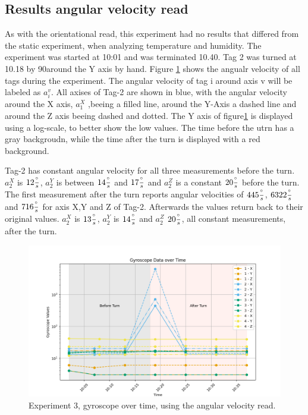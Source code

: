 \subsection{Results angular velocity read}
\label{ss:exp_3_result}
As with the orientational read, this experiment had no results that differed from the static experiment, when analyzing temperature and humidity.
The experiment was started at 10:01 and was terminated 10.40.
Tag 2 was turned at 10.18 by 90\degree around the Y axis by hand.
Figure \ref{f:exp4_graphs_gyro_2} shows the angualr velocity of all tags during the experiment.
The angular velocity of tag i around axis v will be labeled as $a_i^v$.
All axises of Tag-2 are shown in blue, with the angular velocity around the X axis, $a_1^X$ ,beeing a filled line, around the Y-Axis a dashed line and around the Z axis beeing dashed and dotted.
The Y axis of figure\ref{f:exp4_graphs_gyro_2} is displayed using a log-scale, to better show the low values.
The time before the utrn has a gray backgroudn, while the time after the turn is displayed with a red background.


Tag-2 has constant angular velocity for all three measurements before the turn.
$a_2^X$ is $12\frac{^\circ}{s}$, $a_2^Y$ is between $14\frac{^\circ}{s}$ and $17\frac{^\circ}{s}$  and $a_2^Z$ is a constant $20\frac{^\circ}{s}$ before the turn.
The first measurement after the turn reports angular velocities of $445\frac{^\circ}{s}$, $6322\frac{^\circ}{s}$ and $716\frac{^\circ}{s}$ for axis X,Y and Z of Tag-2.
Afterwards the values return back to their original values.
$a_2^X$ is $13\frac{^\circ}{s}$, $a_2^Y$ is $14\frac{^\circ}{s}$ and $a_2^Z$ $20\frac{^\circ}{s}$, all constant measurements, after the turn.

\begin{figure}[ht!]
	\includegraphics[width=\linewidth]{graphics/exp/exp4_2_gyro_data_plot_2.png}
	\caption{Experiment 3, gyroscope over time, using the angular velocity read.}
	\label{f:exp4_graphs_gyro_2}
\end{figure}

